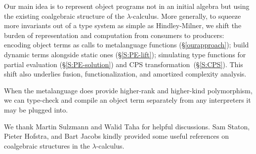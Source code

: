 \documentclass[preprint]{sigplanconf}
\begin{document}
Our main idea is to represent object programs not in an initial algebra
but using the existing coalgebraic structure of the $\lambda$-calculus.
More generally, to squeeze more invariants out of a type system as
simple as Hindley-Milner, we shift the burden of representation and
computation from consumers to producers: encoding object terms as calls
to metalanguage functions (\S\ref{ourapproach}); build dynamic terms
alongside static ones (\S\ref{S:PE-lift}); simulating type functions for
partial evaluation (\S\ref{S:PE-solution}) and CPS
transformation~(\S\ref{S:CPS}).  This shift also underlies fusion,
functionalization, and amortized complexity analysis.

When the metalanguage does provide higher-rank and higher-kind
polymorphism, we can type-check and compile an object term separately
from any interpreters it may be plugged into.

\acks%
We thank Martin Sulzmann and Walid Taha 
for helpful discussions.  Sam Staton, Pieter Hofstra, and Bart Jacobs
kindly provided some useful references on coalgebraic structures in the
$\lambda$\hyp calculus.


\bibsep=0pt

\end{document}
